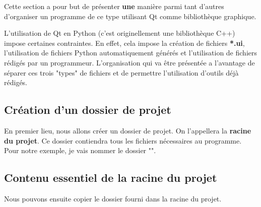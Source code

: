 \documentclass[12pt]{report}    %
\begin{document}
Cette section a pour but de présenter \textbf{une} manière parmi tant d'autres d'organiser un programme de ce type utilisant Qt comme bibliothèque graphique.

L'utilisation de Qt en Python (c'est originellement une bibliothèque C++) impose certaines contraintes. En effet, cela impose la création de fichiers \textbf{*.ui}, l'utilisation de fichiers Python automatiquement générés et l'utilisation de fichiers rédigés par un programmeur.\newline
L'organisation qui va être présentée a l'avantage de séparer ces trois "types" de fichiers et de permettre l'utilisation d'outils déjà rédigés.

\subsection{Création d'un dossier de projet}

En premier lieu, nous allons créer un dossier de projet. On l'appellera la \textbf{racine du projet}. Ce dossier contiendra tous les fichiers nécessaires au programme.\newline
Pour notre exemple, je vais nommer le dossier "".\newline

\subsection{Contenu essentiel de la racine du projet}

Nous pouvons ensuite copier le dossier  fourni dans la racine du projet.\newline
\end{document}
